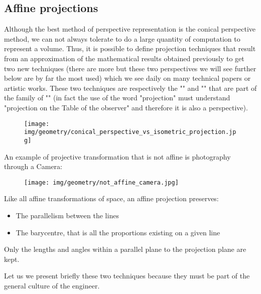 	\pagebreak
	\subsection{Affine projections}
	Although the best method of perspective representation is the conical perspective method, we can not always tolerate to do a large quantity of computation to represent a volume. Thus, it is possible to define projection techniques that result from an approximation of the mathematical results obtained previously to get two new techniques (there are more but these two perspectives we will see further below are by far the most used) which we see daily on many technical  papers or artistic works. These two techniques are respectively the "" and "" that are part of the family of  "" (in fact the use of the word "projection" must understand "projection on the Table of the observer" and therefore it is also a perspective).
	\begin{figure}[H]
		\centering
		\texttt{[image: img/geometry/conical\_perspective\_vs\_isometric\_projection.jpg]}
	\end{figure}
	An example of projective transformation that is not affine is photography through a Camera:
	 
	\begin{figure}[H]
		\centering
		\texttt{[image: img/geometry/not\_affine\_camera.jpg]}
	\end{figure}
	Like all affine transformations of space, an affine projection preserves:
	\begin{itemize}
		\item The parallelism between the lines

		\item The barycentre, that is all the proportions existing on a given line
	\end{itemize}
		Only the lengths and angles within a parallel plane to the projection plane are kept.
	
	Let us we present briefly these two techniques because they must be part of the general culture of the engineer.
	
